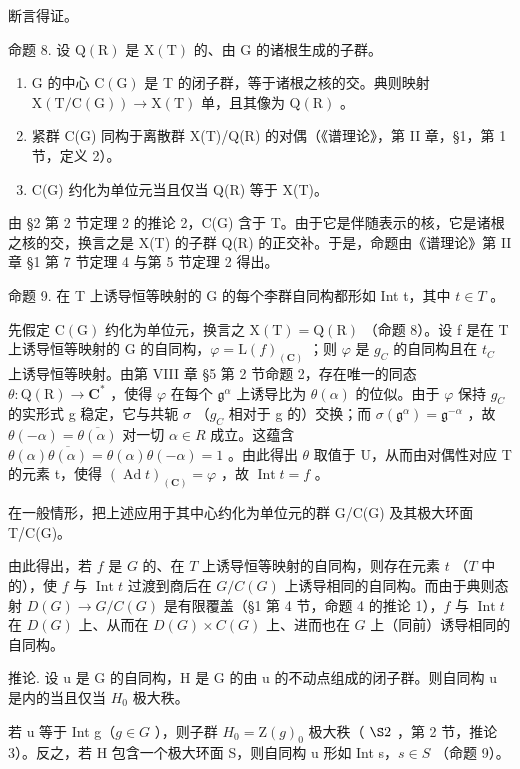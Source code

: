 断言得证。

命题 8. 设 \(\mathrm{Q}(\mathrm{R})\) 是 \(\mathrm{X}(\mathrm{T})\) 的、由 \(\mathrm{G}\) 的诸根生成的子群。

\begin{enumerate}
\def\labelenumi{\alph{enumi})}
\item
  G 的中心 \(\mathrm{C}(\mathrm{G})\) 是 T 的闭子群，等于诸根之核的交。典则映射 \(\mathrm{X}(\mathrm{T}/\mathrm{C}(\mathrm{G})) \to \mathrm{X}(\mathrm{T})\) 单，且其像为 \(\mathrm{Q}(\mathrm{R})\) 。
\item
  紧群 C(G) 同构于离散群 X(T)/Q(R) 的对偶（《谱理论》，第 II 章，§1，第 1 节，定义 2）。
\item
  C(G) 约化为单位元当且仅当 Q(R) 等于 X(T)。
\end{enumerate}

由 §2 第 2 节定理 2 的推论 2，C(G) 含于 T。由于它是伴随表示的核，它是诸根之核的交，换言之是 X(T) 的子群 Q(R) 的正交补。于是，命题由《谱理论》第 II 章 §1 第 7 节定理 4 与第 5 节定理 2 得出。

命题 9. 在 T 上诱导恒等映射的 G 的每个李群自同构都形如 Int t，其中 \(t \in T\) 。

先假定 \(\mathrm{C}(\mathrm{G})\) 约化为单位元，换言之 \(\mathrm{X}(\mathrm{T}) = \mathrm{Q}(\mathrm{R})\) （命题 8）。设 f 是在 T 上诱导恒等映射的 G 的自同构，\(\varphi = \mathrm{L}(f)_{(\mathbf{C})}\) ；则 \(\varphi\) 是 \(g_{C}\) 的自同构且在 \(t_{C}\) 上诱导恒等映射。由第 VIII 章 §5 第 2 节命题 2，存在唯一的同态 \(\theta : \mathrm{Q}(\mathrm{R}) \to \mathbf{C}^{*}\) ，使得 \(\varphi\) 在每个 \(\mathfrak{g}^{\alpha}\) 上诱导比为 \(\theta(\alpha)\) 的位似。由于 \(\varphi\) 保持 \(g_{C}\) 的实形式 g 稳定，它与共轭 \(\sigma\) （\(g_{C}\) 相对于 g 的）交换；而 \(\sigma(\mathfrak{g}^{\alpha}) = \mathfrak{g}^{-\alpha}\) ，故 \(\theta(-\alpha) = \overline{\theta(\alpha)}\) 对一切 \(\alpha \in R\) 成立。这蕴含 \(\theta(\alpha)\overline{\theta(\alpha)} = \theta(\alpha)\theta(-\alpha) = 1\) 。由此得出 \(\theta\) 取值于 U，从而由对偶性对应 T 的元素 t，使得 \((\operatorname{Ad} t)_{(\mathbf{C})} = \varphi\) ，故 \(\operatorname{Int} t = f\) 。

在一般情形，把上述应用于其中心约化为单位元的群 G/C(G) 及其极大环面 T/C(G)。

由此得出，若 \(f\) 是 \(G\) 的、在 \(T\) 上诱导恒等映射的自同构，则存在元素 \(t\) （\(T\) 中的），使 \(f\) 与 \(\operatorname{Int} t\) 过渡到商后在 \(G / C(G)\) 上诱导相同的自同构。而由于典则态射 \(D(G) \to G / C(G)\) 是有限覆盖（§1 第 4 节，命题 4 的推论 1），\(f\) 与 \(\operatorname{Int} t\) 在 \(D(G)\) 上、从而在 \(D(G) \times C(G)\) 上、进而也在 \(G\) 上（同前）诱导相同的自同构。

推论. 设 u 是 G 的自同构，H 是 G 的由 u 的不动点组成的闭子群。则自同构 u 是内的当且仅当 \(H_{0}\) 极大秩。

若 u 等于 Int g（\(g \in G\) ），则子群 \(H_{0} = \mathrm{Z}(g)_{0}\) 极大秩（ \(\S2\) ，第 2 节，推论 3）。反之，若 H 包含一个极大环面 S，则自同构 u 形如 Int s，\(s \in S\) （命题 9）。
\relax{}
